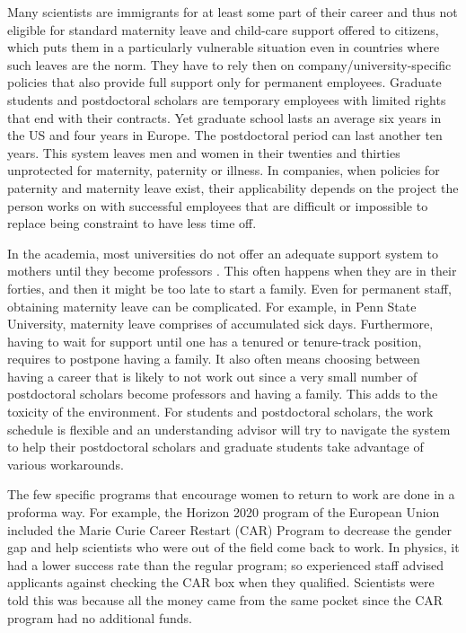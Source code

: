 \documentclass[utf8]{frontiersSCNS} %
\begin{document}
Many scientists are immigrants for at least some part of their career and thus not eligible for standard maternity leave and child-care support offered to citizens, which puts them in a particularly vulnerable situation even in countries where such leaves are the norm. They have to rely then on company/university-specific policies that also provide full support only for permanent employees. Graduate students and postdoctoral scholars are temporary employees with limited rights that end with their contracts. Yet graduate school lasts an average six years in the US and four years in Europe. The postdoctoral period can last another ten years. This system leaves men and women in their twenties and thirties unprotected for maternity, paternity or illness. In companies, when policies for paternity and maternity leave exist, their applicability depends on the project the person works on with successful employees that are difficult or impossible to replace being constraint to have less time off.

In the academia, most universities do not offer an adequate support system to mothers until they become professors \citep{2018Report}. This often happens when they are in their forties, and then it might be too late to start a family.  Even for permanent staff, obtaining maternity leave can be complicated. For example, in Penn State University, maternity leave comprises of accumulated sick days.  Furthermore, having to wait for support until one has a tenured or tenure-track position, requires to postpone having a family. It also often means choosing between having a career that is likely to not work out since a very small number of postdoctoral scholars become professors and having a family. This adds to the toxicity of the environment.  For students and postdoctoral scholars, the work schedule is flexible and an understanding advisor will try to navigate the system to help their postdoctoral scholars and graduate students take advantage of various workarounds. %

The few specific programs that encourage women to return to work are done in a proforma way. For example, the Horizon 2020 program of the European Union included the Marie Curie Career Restart (CAR) Program to decrease the gender gap and help scientists who were out of the field come back to work. In physics, it had a lower success rate than the regular program; so experienced staff advised applicants against checking the CAR box when they qualified. Scientists were told this was because all the money came from the same pocket since the CAR program had no additional funds. 
\end{document}
